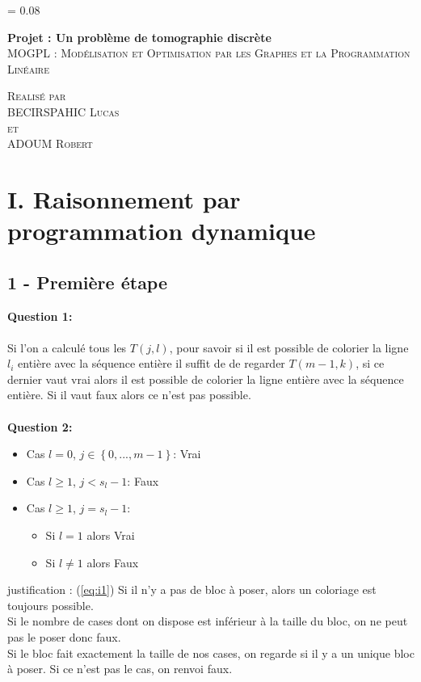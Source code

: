 \documentclass[a4paper]{memoir}
\newlength{\drop}
\newcommand*{\titleM}{\begingroup %
\drop = 0.08\textheight
\centering
\vspace*{\drop}

{\Huge\bfseries Projet : Un problème de tomographie discrète}\\[\baselineskip]

{\large\scshape MOGPL : Modélisation et Optimisation par les Graphes et la Programmation Linéaire}\\[\baselineskip]

\begin{vplace}[0.7]
    \textit{}
\end{vplace}

{\scshape Realisé par\\ BECIRSPAHIC Lucas\\ et\\ ADOUM Robert}\par

\vspace*{2\drop}
\endgroup}
\begin{document}
    \begin{center}
    \titleM 
    \end{center}
    \clearpage
    
    \begin{center}
    \tableofcontents
    \end{center}
    
    \newpage
    
    \section{I. Raisonnement par programmation dynamique}
    \subsection{1 - Première étape}
    \textbf{Question 1:}\\\\ Si l’on a calculé tous les $T(j, l)$, pour savoir si il est possible de colorier la ligne $l_{i}$ entière avec la séquence entière  il suffit de de regarder $T(m-1, k)$, si ce dernier vaut vrai alors il est possible de colorier la ligne entière avec la séquence entière. Si il vaut faux alors ce n'est pas possible.\\\\
    \textbf{Question 2:}
    \begin{itemize}
    \item Cas $l = 0$, $j\in{\left\lbrace 0,...,m-1 \right\rbrace }$: Vrai       \label{eq:i1}
		\item Cas $l \geqslant 1$, $j < s_{l}-1$: Faux
		\item Cas $l \geqslant 1$, $j = s_{l}-1$:
		\begin{itemize}
			\item Si $l = 1$ alors Vrai 
			\item Si $l \neq 1$ alors Faux
		\end{itemize}
    \end{itemize}
    justification : (\ref{eq:i1}) Si il n'y a pas de bloc à poser, alors un coloriage est toujours possible. \\
    Si le nombre de cases dont on dispose est inférieur à la taille du bloc, on ne peut pas le poser donc faux. \\
    Si le bloc fait exactement la taille de nos cases, on regarde si il y a un unique bloc à poser. Si ce n'est pas le cas, on renvoi faux.
    
\end{document}
